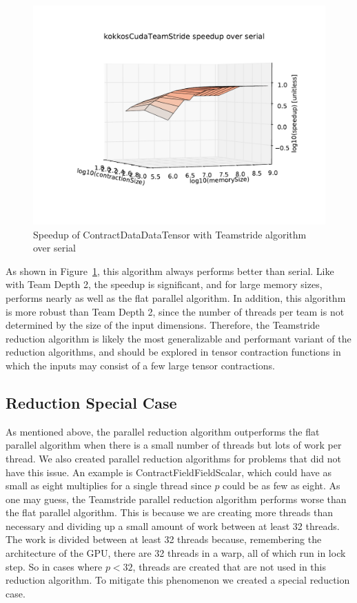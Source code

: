 \begin{figure}[ht]
    \includegraphics[scale=.55]{./VersusSerial_kokkosCudaTeamStride_clearCache_shadowfax.pdf}
\caption{Speedup of ContractDataDataTensor with Teamstride algorithm over
    serial
\label{fig:ContractDataDataTensorTeamstride}} 
\end{figure}

As shown in Figure~\ref{fig:ContractDataDataTensorTeamstride}, this algorithm
always performs better than serial.  Like with Team Depth 2, the speedup is
significant, and for large memory sizes, performs nearly as well as the flat
parallel algorithm.  In addition, this algorithm is more robust than Team Depth
2, since the number of threads per team is not determined by the size of the
input dimensions.  Therefore, the Teamstride reduction algorithm is likely the
most generalizable and performant variant of the reduction algorithms, and
should be explored in tensor contraction functions in which the inputs may
consist of a few large tensor contractions.

\subsection{Reduction Special Case}
As mentioned above, the parallel reduction algorithm outperforms the flat parallel algorithm when there is a small number of threads but lots of work per
thread. We also created parallel reduction algorithms for problems that did
not have this issue. An example is ContractFieldFieldScalar, which could have
as small as eight multiplies for a single thread since $p$ could be as few as
eight. As one may guess, the Teamstride parallel reduction algorithm performs worse than the flat
parallel algorithm. This is because we are creating more threads than necessary
and dividing up a small amount of work between at least 32 threads. The work is
divided between at least 32 threads because, remembering the architecture of
the GPU, there are 32 threads in a warp, all of which run in lock step. So in
cases where $p < 32$, threads are created that are not used in this reduction
algorithm. To mitigate this phenomenon we created a special reduction case.


